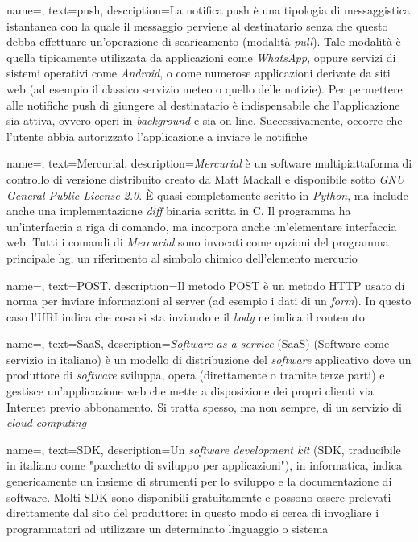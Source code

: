 {
    name=,
    text=push,
    description={La notifica push è una tipologia di messaggistica istantanea con la quale il messaggio perviene al destinatario senza che questo debba effettuare un'operazione di scaricamento (modalità \emph{pull}). Tale modalità è quella tipicamente utilizzata da applicazioni come \emph{WhatsApp}, oppure servizi di sistemi operativi come \emph{Android}, o come numerose applicazioni derivate da siti web (ad esempio il classico servizio meteo o quello delle notizie).
Per permettere alle notifiche push di giungere al destinatario è indispensabile che l'applicazione sia attiva, ovvero operi in \emph{background} e sia on-line. Successivamente, occorre che l'utente abbia autorizzato l'applicazione a inviare le notifiche}
}

{
    name=,
    text=Mercurial,
    description={\emph{Mercurial} è un software multipiattaforma di controllo di versione distribuito creato da Matt Mackall e disponibile sotto \emph{GNU General Public License 2.0}.
È quasi completamente scritto in \emph{Python}, ma include anche una implementazione \emph{diff} binaria scritta in C. Il programma ha un'interfaccia a riga di comando, ma incorpora anche un'elementare interfaccia web. 
Tutti i comandi di \emph{Mercurial} sono invocati come opzioni del programma principale hg, un riferimento al simbolo chimico dell'elemento mercurio}
}

{
    name=,
    text=POST,
    description={Il metodo POST è un metodo HTTP usato di norma per inviare informazioni
al server (ad esempio i dati di un \emph{form}). In questo caso l’URI indica che cosa si
sta inviando e il \emph{body} ne indica il contenuto}
}

{
    name=,
    text=SaaS,
    description={\emph{Software as a service} (SaaS) (Software come servizio in italiano) è un modello di distribuzione del \emph{software} applicativo dove un produttore di \emph{software} sviluppa, opera (direttamente o tramite terze parti) e gestisce un'applicazione web che mette a disposizione dei propri clienti via Internet previo abbonamento. Si tratta spesso, ma non sempre, di un servizio di \emph{cloud computing}}
}

{
    name=,
    text=SDK,
    description={Un \emph{software development kit} (SDK, traducibile in italiano come "pacchetto di sviluppo per applicazioni"), in informatica, indica genericamente un insieme di strumenti per lo sviluppo e la documentazione di software. Molti SDK sono disponibili gratuitamente e possono essere prelevati direttamente dal sito del produttore: in questo modo si cerca di invogliare i programmatori ad utilizzare un determinato linguaggio o sistema}
}

